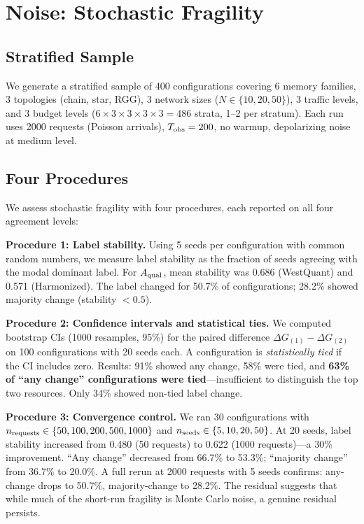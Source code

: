 \documentclass{ams-journal}
\newcommand{\DG}{\Delta G}
\newcommand{\Aqual}{A_{\rm qual}}
\begin{document}
\section{Noise: Stochastic Fragility}
\label{sec:noise}

\subsection{Stratified Sample}

We generate a stratified sample of 400 configurations covering 6 memory families, 3 topologies (chain, star, RGG), 3 network sizes ($N \in \{10, 20, 50\}$), 3 traffic levels, and 3 budget levels ($6 \times 3 \times 3 \times 3 \times 3 = 486$ strata, 1--2 per stratum). Each run uses 2000 requests (Poisson arrivals), $T_{\rm obs} = 200$, no warmup, depolarizing noise at medium level.

\subsection{Four Procedures}

We assess stochastic fragility with four procedures, each reported on all four agreement levels:

\textbf{Procedure 1: Label stability.} Using 5 seeds per configuration with common random numbers, we measure label stability as the fraction of seeds agreeing with the modal dominant label. For $\Aqual$, mean stability was 0.686 (WestQuant) and 0.571 (Harmonized). The label changed for 50.7\% of configurations; 28.2\% showed majority change (stability $< 0.5$).

\textbf{Procedure 2: Confidence intervals and statistical ties.} We computed bootstrap CIs (1000 resamples, 95\%) for the paired difference $\DG_{(1)} - \DG_{(2)}$ on 100 configurations with 20 seeds each. A configuration is \emph{statistically tied} if the CI includes zero. Results: 91\% showed any change, 58\% were tied, and \textbf{63\% of ``any change'' configurations were tied}---insufficient to distinguish the top two resources. Only 34\% showed non-tied label change.

\textbf{Procedure 3: Convergence control.} We ran 30 configurations with $n_{\rm requests} \in \{50, 100, 200, 500, 1000\}$ and $n_{\rm seeds} \in \{5, 10, 20, 50\}$. At 20 seeds, label stability increased from 0.480 (50 requests) to 0.622 (1000 requests)---a 30\% improvement. ``Any change'' decreased from 66.7\% to 53.3\%; ``majority change'' from 36.7\% to 20.0\%. A full rerun at 2000 requests with 5 seeds confirms: any-change drops to 50.7\%, majority-change to 28.2\%. The residual suggests that while much of the short-run fragility is Monte Carlo noise, a genuine residual persists.
\end{document}
